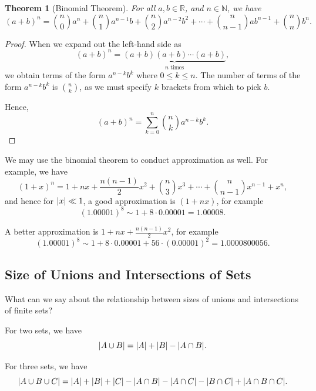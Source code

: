 \documentclass{article}
\newtheorem{theorem}{Theorem}[section]
\theoremstyle{definition}
\theoremstyle{remark}
\DeclarePairedDelimiter{\abs}{\lvert}{\rvert}
\newcommand{\pqty}[1]{\left(#1\right)}
\newcommand{\NN}{\mathbb{N}}
\newcommand{\RR}{\mathbb{R}}
\begin{document}
\begin{theorem}[Binomial Theorem]
    For all \(a, b \in \RR\), and \(n \in \NN\), we have
    \[
        \pqty{a + b}^n = \binom{n}{0} a^n + \binom{n}{1} a^{n - 1} b + \binom{n}{2} a^{n - 2} b^2 + \cdots + \binom{n}{n - 1} a b^{n - 1} + \binom{n}{n} b^n.
    \]
\end{theorem}

\begin{proof}
    When we expand out the left-hand side as
    \[
        \pqty{a + b}^n = \underbrace{\pqty{a + b} \pqty{a + b} \cdots \pqty{a + b}}_{n \text{ times}},
    \]
    we obtain terms of the form \(a^{n - k} b^k\) where \(0 \leq k \leq n\). The number of terms of the form \(a^{n - k} b^k\) is \(\binom{n}{k}\), as we must specify \(k\) brackets from which to pick \(b\).

    Hence,
    \[
        \pqty{a + b}^n = \sum_{k = 0}^{n} \binom{n}{k} a^{n - k} b^k.
    \]
\end{proof}

We may use the binomial theorem to conduct approximation as well. For example, we have
\[
    \pqty{1 + x}^n = 1 + nx + \frac{n \pqty{n - 1}}{2} x^2 + \binom{n}{3} x^3 + \cdots + \binom{n}{n - 1} x^{n - 1} + x^n,
\]
and hence for \(\abs{x} \ll 1\), a good approximation is \(\pqty{1 + nx}\), for example
\[
    \pqty{1.00001}^8 \sim 1 + 8 \cdot 0.00001 = 1.00008.
\]

A better approximation is \(1 + nx + \frac{n\pqty{n - 1}}{2}x^2\), for example
\[
    \pqty{1.00001}^8 \sim 1 + 8 \cdot 0.00001 + 56 \cdot \pqty{0.00001}^2 = 1.0000800056.
\]

\subsection{Size of Unions and Intersections of Sets}
\label{sec:size-unions-intersections-sets}

What can we say about the relationship between sizes of unions and intersections of finite sets?

For two sets, we have
\[
    \abs{A \cup B} = \abs{A} + \abs{B} - \abs{A \cap B}.
\]

For three sets, we have
\[
    \abs{A \cup B \cup C} = \abs{A} + \abs{B} + \abs{C} - \abs{A \cap B} - \abs{A \cap C} - \abs{B \cap C} + \abs{A \cap B \cap C}.
\]
\end{document}
